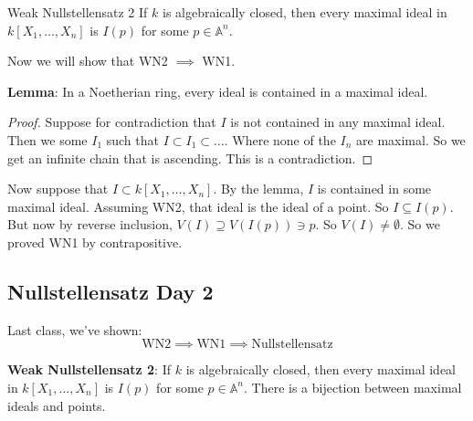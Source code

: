 \documentclass{report}
\begin{document}
\begin{theorem}{Weak Nullstellensatz 2}
    If $k$ is algebraically closed, then every maximal ideal in $k[X_{1}, \ldots, X_{n}]$ is $I(p)$ for some $p \in \mathbb{A}^{n}$.
\end{theorem}

Now we will show that WN2 $\implies $ WN1.

\textbf{Lemma}: In a Noetherian ring, every ideal is contained in a maximal ideal.
    \begin{proof}
        Suppose for contradiction that $I$ is not contained in any maximal ideal. Then we some $I_{1}$ such that $I \subset I_{1} \subset \ldots$. Where none of the $I_{n}$ are maximal. So we get an infinite chain that is ascending. This is a contradiction.
    \end{proof}

Now suppose that $I \subset k[X_{1}, \ldots, X_{n}]$. By the lemma, $I$ is contained in some maximal ideal. Assuming WN2, that ideal is the ideal of a point. So $I \subseteq I(p)$.
 But now by reverse inclusion, $V(I) \supseteq V(I(p)) \ni p$. So $V(I) \neq \emptyset$. So we proved WN1 by contrapositive.

\begin{topic}
    \section{Nullstellensatz Day 2}
\end{topic}

Last class, we've shown:
    \begin{equation*}
        \text{WN2} \implies \text{WN1} \implies \text{Nullstellensatz}
    \end{equation*}

\textbf{Weak Nullstellensatz 2}: If $k$ is algebraically closed, then every maximal ideal in $k[X_{1}, \ldots, X_{n}]$ is $I(p)$ for some $p \in \mathbb{A}^{n}$. There is a bijection between maximal ideals and points.
\end{document}
